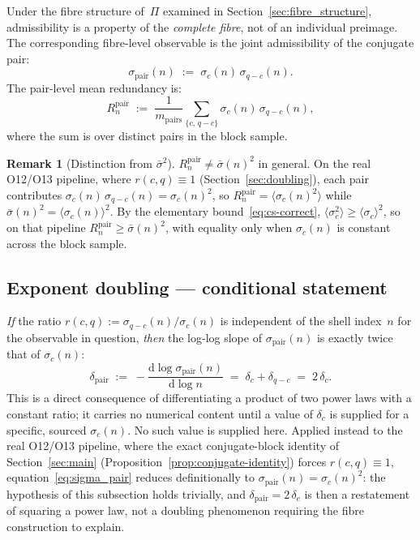 \documentclass[11pt,a4paper]{article}
\theoremstyle{definition}
\newtheorem{remark}[theorem]{Remark}
\begin{document}
    Under the fibre structure of~$\Pi$ examined in
    Section~\ref{sec:fibre_structure}, admissibility is a property of the
    \emph{complete fibre}, not of an individual preimage.
    The corresponding fibre-level observable is the joint admissibility of
    the conjugate pair:
    \begin{equation}
      \sigma_{\mathrm{pair}}(n) \;:=\; \sigma_c(n)\,\sigma_{q-c}(n).
      \label{eq:sigma_pair}
    \end{equation}
    The pair-level mean redundancy is:
    \begin{equation}
      R_n^{\mathrm{pair}} \;:=\; \frac{1}{m_{\mathrm{pairs}}}
      \sum_{\{c,\,q-c\}} \sigma_c(n)\,\sigma_{q-c}(n),
      \label{eq:R_pair}
    \end{equation}
    where the sum is over distinct pairs in the block sample.

    \begin{remark}[Distinction from $\bar\sigma^2$]
$R_n^{\mathrm{pair}} \neq \bar\sigma(n)^2$ in general.
On the real O12/O13 pipeline, where $r(c,q) \equiv 1$
(Section~\ref{sec:doubling}), each pair contributes
$\sigma_c(n)\,\sigma_{q-c}(n) = \sigma_c(n)^2$, so
$R_n^{\mathrm{pair}} = \langle\sigma_c(n)^2\rangle$ while
$\bar\sigma(n)^2 = \langle\sigma_c(n)\rangle^2$.
By the elementary bound~\eqref{eq:cs-correct},
$\langle\sigma_c^2\rangle \geq \langle\sigma_c\rangle^2$, so on that
pipeline $R_n^{\mathrm{pair}} \geq \bar\sigma(n)^2$, with equality only
when $\sigma_c(n)$ is constant across the block sample.
    \end{remark}

  \subsection{Exponent doubling --- conditional statement}
    \label{subsec:doubling}

    \emph{If} the ratio $r(c,q) := \sigma_{q-c}(n)/\sigma_c(n)$ is
    independent of the shell index~$n$ for the observable in question,
    \emph{then} the log-log slope of $\sigma_{\mathrm{pair}}(n)$ is
    exactly twice that of $\sigma_c(n)$:
    \begin{equation}
      \delta_{\mathrm{pair}} \;:=\;
      -\frac{\mathrm{d}\log\sigma_{\mathrm{pair}}(n)}{\mathrm{d}\log n}
      \;=\; \delta_c + \delta_{q-c} \;=\; 2\,\delta_c.
      \label{eq:doubling}
    \end{equation}
    This is a direct consequence of differentiating a product of two power
    laws with a constant ratio; it carries no numerical content until a
    value of $\delta_c$ is supplied for a specific, sourced $\sigma_c(n)$.
    No such value is supplied here.
    Applied instead to the real O12/O13 pipeline, where the exact
    conjugate-block identity of Section~\ref{sec:main}
    (Proposition~\ref{prop:conjugate-identity}) forces $r(c,q) \equiv 1$,
    equation~\eqref{eq:sigma_pair} reduces definitionally to
    $\sigma_{\mathrm{pair}}(n) = \sigma_c(n)^2$: the hypothesis of this
    subsection holds trivially, and $\delta_{\mathrm{pair}} = 2\,\delta_c$
    is then a restatement of squaring a power law, not a doubling
    phenomenon requiring the fibre construction to explain.
\end{document}
